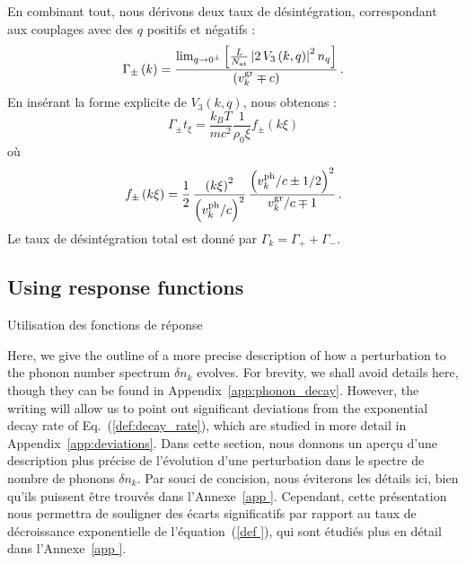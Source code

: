\documentclass[aps,prd,notitlepage,amsfonts,amssymb,amsmath,nofootinbib,superscriptaddress,longbibliography]{revtex4-2}
\newcommand{\trad}[1]{\textcolor{tradcolor}{#1}}
\begin{document}
{En combinant tout, nous dérivons deux taux de désintégration, correspondant aux couplages avec des \(q\) positifs et négatifs :
\begin{equation*}
    \Gamma_{\pm}\left(k\right) = \frac{{\rm lim}_{q \to 0^{\pm}} \left[ \frac{L}{N_{\rm at}} \left|2 \, V_3\left(k,q\right)\right|^{2} n_{q} \right]}{\left(v^{\rm gr}_k \mp c\right)} \,.
\end{equation*}
En insérant la forme explicite de \(V_3\left(k,q\right)\), nous obtenons :
\begin{equation*}
\label{def:decay_rate}
    \Gamma_{\pm} t_{\xi} = \frac{k_{B}T}{m c^2} \frac{1}{\rho_{0}\xi} f_{\pm}\left(k\xi\right)
\end{equation*}
où
\begin{equation*}
    f_{\pm}\left(k\xi\right) = \frac{1}{2} \, \frac{\left(k\xi\right)^{2}}{\left(v^{\rm ph}_k/c\right)^{2}} \, \frac{\left(v^{\rm ph}_k/c \pm 1/2\right)^{2}}{v^{\rm gr}_k/c \mp 1} \,.
\end{equation*}
Le taux de désintégration total est donné par \(\Gamma_{k} = \Gamma_{+} + \Gamma_{-}\). 
}




\subsection{Using response functions}
\label{subsec:Response_functions}
\trad{Utilisation des fonctions de réponse}

Here, we give the outline of a more precise description of how a perturbation to the phonon number spectrum $\delta n_k$ evolves.  For brevity, we shall avoid details here, though they can be found in Appendix~\ref{app:phonon_decay}.  However, the writing will allow us to point out significant deviations from the exponential decay rate of Eq.~(\ref{def:decay_rate}), which are studied in more detail in Appendix~\ref{app:deviations}.
\trad{Dans cette section, nous donnons un aperçu d'une description plus précise de l'évolution d'une perturbation dans le spectre de nombre de phonons $\delta n_k$. Par souci de concision, nous éviterons les détails ici, bien qu'ils puissent être trouvés dans l'Annexe~\ref{app
}. Cependant, cette présentation nous permettra de souligner des écarts significatifs par rapport au taux de décroissance exponentielle de l'équation~(\ref{def
}), qui sont étudiés plus en détail dans l'Annexe~\ref{app
}.}
\end{document}
